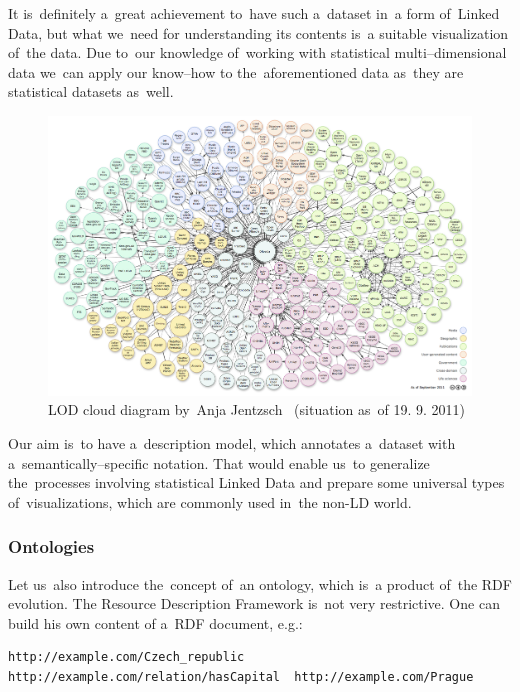 It is~definitely a~great achievement to~have such a~dataset in~a form of~Linked Data, but
what we~need for understanding its contents is~a suitable visualization of~the data.
Due to~our knowledge of~working with statistical multi--dimensional data we~can apply our know--how
to the~aforementioned data as~they are statistical datasets as~well.

\begin{figure}
	\centering
	\includegraphics[width=150mm]{img/lod-cloud.png}
	\caption{LOD cloud diagram by~Anja Jentzsch~\cite{lod-cloud} (situation as~of 19. 9. 2011)}
	\label{fig:lod-cloud}
\end{figure}

Our aim is~to have a~description model, which annotates a~dataset with a~semantically--specific
notation. That would enable us~to generalize the~processes involving statistical Linked Data
and prepare some universal types of~visualizations, which are commonly used in~the non-LD world.

\subsubsection{Ontologies}

Let us~also introduce the~concept of~an ontology, which is~a product of~the RDF evolution.
The Resource Description Framework is~not very restrictive. One can build his own content
of a~RDF document, e.g.:

\scriptsize\begin{verbatim}
http://example.com/Czech_republic	http://example.com/relation/hasCapital	http://example.com/Prague
\end{verbatim}\normalsize

